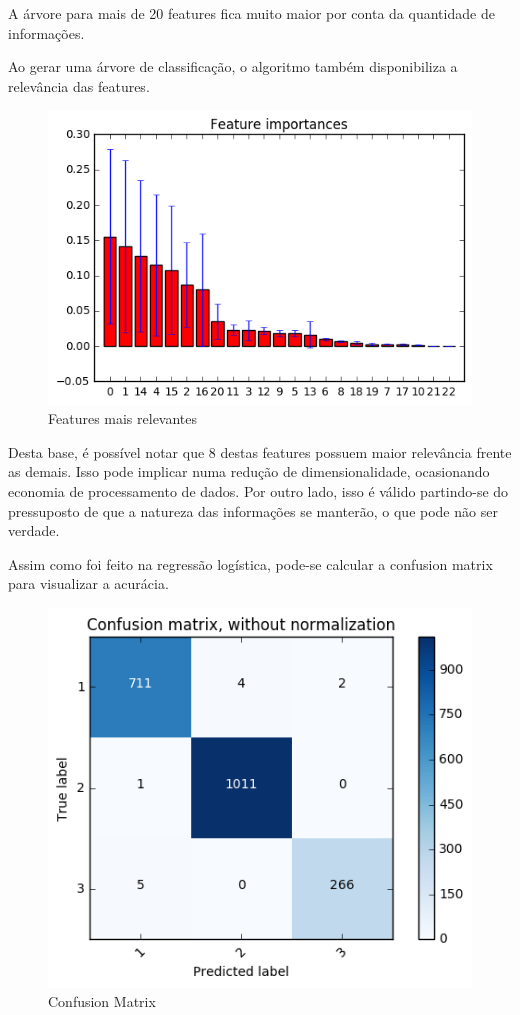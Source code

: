 A árvore para mais de 20 features fica muito maior por conta da quantidade de informações.


Ao gerar uma árvore de classificação, o algoritmo também disponibiliza a relevância das features.

\begin{figure}[!ht]
\caption{Features mais relevantes}
\centerline{\includegraphics[width=.7\textwidth]{img/tree-most-important-features}}
\end{figure}

Desta base, é possível notar que 8 destas features possuem maior relevância frente as demais. Isso pode implicar numa redução de dimensionalidade, ocasionando economia de processamento de dados. Por outro lado, isso é válido partindo-se do pressuposto de que a natureza das informações se manterão, o que pode não ser verdade.

%
%

Assim como foi feito na regressão logística, pode-se calcular a confusion matrix para visualizar a acurácia.

\begin{figure}[!ht]
\caption{Confusion Matrix}
\centerline{\includegraphics[width=.6\textwidth]{img/confusionMatrix}}
\end{figure}

